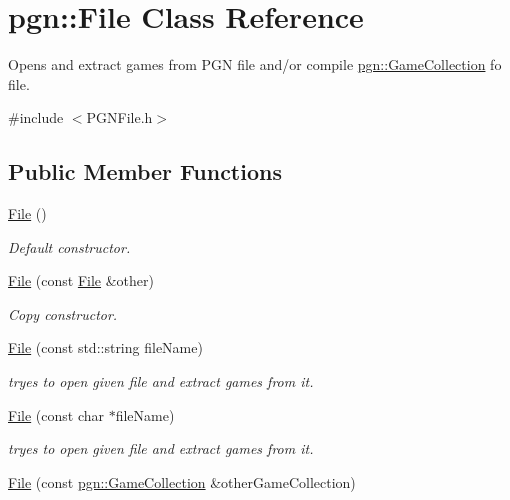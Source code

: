 \hypertarget{classpgn_1_1File}{
\section{pgn::File Class Reference}
\label{classpgn_1_1File}
}


Opens and extract games from PGN file and/or compile \hyperlink{classpgn_1_1GameCollection}{pgn::GameCollection} fo file.  




{\ttfamily \#include $<$PGNFile.h$>$}

\subsection*{Public Member Functions}
\begin{DoxyCompactItemize}
\item 
\hypertarget{classpgn_1_1File_ae1c405e1012bb88a57368e0568b35848}{
\hyperlink{classpgn_1_1File_ae1c405e1012bb88a57368e0568b35848}{File} ()}
\label{classpgn_1_1File_ae1c405e1012bb88a57368e0568b35848}

\begin{DoxyCompactList}\small\item\em Default constructor. \item\end{DoxyCompactList}\item 
\hypertarget{classpgn_1_1File_ae56a13f22bd4a526e2fa01021822b90f}{
\hyperlink{classpgn_1_1File_ae56a13f22bd4a526e2fa01021822b90f}{File} (const \hyperlink{classpgn_1_1File}{File} \&other)}
\label{classpgn_1_1File_ae56a13f22bd4a526e2fa01021822b90f}

\begin{DoxyCompactList}\small\item\em Copy constructor. \item\end{DoxyCompactList}\item 
\hyperlink{classpgn_1_1File_a1eb1b99828881fa94d69ddae6c3bbc41}{File} (const std::string fileName)
\begin{DoxyCompactList}\small\item\em tryes to open given file and extract games from it. \item\end{DoxyCompactList}\item 
\hyperlink{classpgn_1_1File_a7bc1d544b41893f46bed8a3d027b8328}{File} (const char $\ast$fileName)
\begin{DoxyCompactList}\small\item\em tryes to open given file and extract games from it. \item\end{DoxyCompactList}\item 
\hypertarget{classpgn_1_1File_a69fd6e6d95f8bcff3ead7347232e347b}{
\hyperlink{classpgn_1_1File_a69fd6e6d95f8bcff3ead7347232e347b}{File} (const \hyperlink{classpgn_1_1GameCollection}{pgn::GameCollection} \&otherGameCollection)}
\label{classpgn_1_1File_a69fd6e6d95f8bcff3ead7347232e347b}


\end{DoxyCompactItemize}
